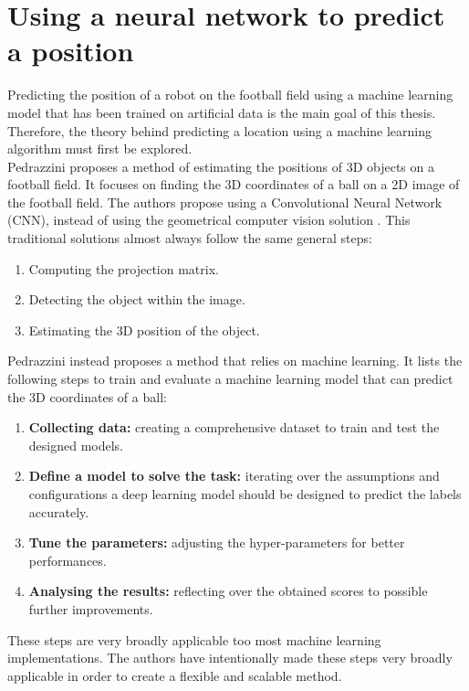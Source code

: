 \documentclass{uva-inf-bachelor-thesis}
\begin{document}
     \section{Using a neural network to predict a position}
        Predicting the position of a robot on the football field using a machine learning model that has been trained on artificial data is the main goal of this thesis. Therefore, the theory behind predicting a location using a machine learning algorithm must first be explored.
        \hfill \break \\
        Pedrazzini \cite{posest} proposes a method of estimating the positions of 3D objects on a football field. It focuses on finding the 3D coordinates of a ball on a 2D image of the football field. The authors propose using a Convolutional Neural Network (CNN), instead of using the geometrical computer vision solution \cite{ex1} \cite{ex2}. This traditional solutions almost always follow the same general steps: \begin{enumerate}
            \item Computing the projection matrix.
            \item Detecting the object within the image.
            \item Estimating the 3D position of the object.
        \end{enumerate}
        Pedrazzini \cite{posest} instead proposes a method that relies on machine learning. It lists the following steps to train and evaluate a machine learning model that can predict the 3D coordinates of a ball: \begin{enumerate}
            \item \textbf{Collecting data:} creating a comprehensive dataset to train and test the designed models.
            \item \textbf{Define a model to solve the task:} iterating over the assumptions and configurations a deep learning model should be designed to predict the labels accurately.
            \item \textbf{Tune the parameters:} adjusting the hyper-parameters for better performances.
            \item \textbf{Analysing the results:} reflecting over the obtained scores to possible further improvements.
        \end{enumerate} 
        These steps are very broadly applicable too most machine learning implementations. The authors have intentionally made these steps very broadly applicable in order to create a flexible and scalable method. 
\end{document}
